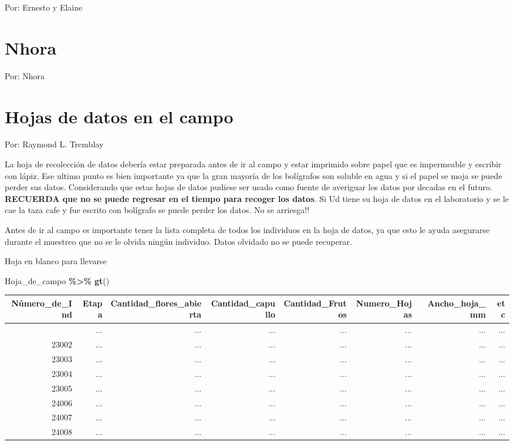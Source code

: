 \documentclass[
]{book}
\newenvironment{Shaded}{\begin{snugshade}}{\end{snugshade}}
\newcommand{\FunctionTok}[1]{\textcolor[rgb]{0.13,0.29,0.53}{\textbf{#1}}}
\newcommand{\NormalTok}[1]{#1}
\newcommand{\SpecialCharTok}[1]{\textcolor[rgb]{0.81,0.36,0.00}{\textbf{#1}}}
\theoremstyle{definition}
\theoremstyle{definition}
\theoremstyle{definition}
\theoremstyle{definition}
\theoremstyle{remark}
\begin{document}
Por: Ernesto y Elaine

\chapter{Nhora}\label{nhora}

Por: Nhora

\chapter{Hojas de datos en el campo}\label{hojas-de-datos-en-el-campo}

Por: Raymond L. Tremblay

La hoja de recolección de datos debería estar preparada antes de ir al campo y estar imprimido sobre papel que es impermeable y escribir con lápiz. Ese ultimo punto es bien importante ya que la gran mayoría de los bolígrafos son soluble en agua y si el papel se moja se puede perder sus datos. Considerando que estas hojas de datos pudiese ser usado como fuente de averiguar los datos por decadas en el futuro. \textbf{RECUERDA que no se puede regresar en el tiempo para recoger los datos}. Si Ud tiene su hoja de datos en el laboratorio y se le cae la taza cafe y fue escrito con bolígrafo se puede perder los datos. No se arriesga!!

Antes de ir al campo es importante tener la lista completa de todos los individuos en la hoja de datos, ya que esto le ayuda asegurarse durante el muestreo que no se le olvida ningún individuo. Datos olvidado no se puede recuperar.

Hoja en blanco para llevarse

\begin{Shaded}
\begin{Highlighting}[]
\NormalTok{Hoja\_de\_campo }\SpecialCharTok{\%\textgreater{}\%} \FunctionTok{gt}\NormalTok{()}
\end{Highlighting}
\end{Shaded}

\begin{longtable}{rrrrrrrr}
\toprule
Número\_de\_Ind & Etapa & Cantidad\_flores\_abierta & Cantidad\_capullo & Cantidad\_Frutos & Numero\_Hojas & Ancho\_hoja\_mm & etc \\ 
\midrule\addlinespace[2.5pt]
23001 & ... & ... & ... & ... & ... & ... & ... \\ 
23002 & ... & ... & ... & ... & ... & ... & ... \\ 
23003 & ... & ... & ... & ... & ... & ... & ... \\ 
23004 & ... & ... & ... & ... & ... & ... & ... \\ 
23005 & ... & ... & ... & ... & ... & ... & ... \\ 
24006 & ... & ... & ... & ... & ... & ... & ... \\ 
24007 & ... & ... & ... & ... & ... & ... & ... \\ 
24008 & ... & ... & ... & ... & ... & ... & ... \\ 
\bottomrule
\end{longtable}
\end{document}
